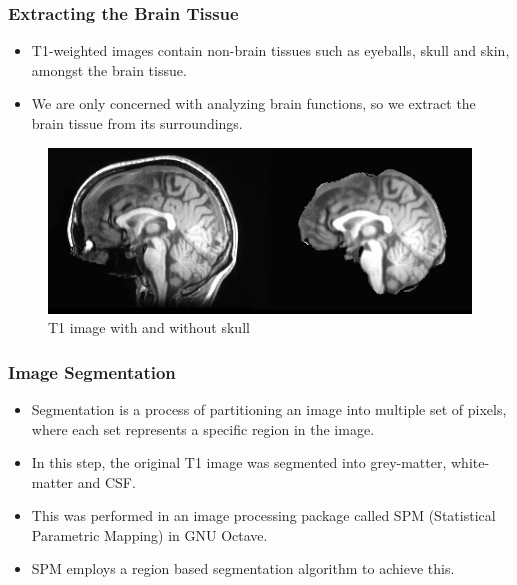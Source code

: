 \documentclass{beamer}
\begin{document}
  \begin{frame}[t]
    \frametitle{Extracting the Brain Tissue}

    \begin{itemize}

      \item T1-weighted images contain non-brain tissues such as
        eyeballs, skull and skin, amongst the brain tissue. \vskip
        10pt

      \item We are only concerned with analyzing brain functions, so
        we extract the brain tissue from its surroundings.  \vskip 10pt

    \end{itemize}

    \begin{figure}[H]
      \centering
      \includegraphics[width=0.7\linewidth]{./.img/skull-striped-presentation.png}
      \caption{T1 image with and without skull}%
      \label{fig:name}
    \end{figure}

  \end{frame}

  \begin{frame}[t]
    \frametitle{Image Segmentation}

    \vskip 20pt

    \begin{itemize}

      \item Segmentation is a process of partitioning an image into
        multiple set of pixels, where each set represents a specific
        region in the image. \vskip 10pt

      \item In this step, the original T1 image was segmented into
        grey-matter, white-matter and CSF. \vskip 10pt

      \item This was performed in an image processing package called
        SPM (Statistical Parametric Mapping) in GNU Octave. \vskip 10pt

      \item SPM employs a region based segmentation algorithm to
        achieve this.

    \end{itemize}

  \end{frame}
\end{document}
